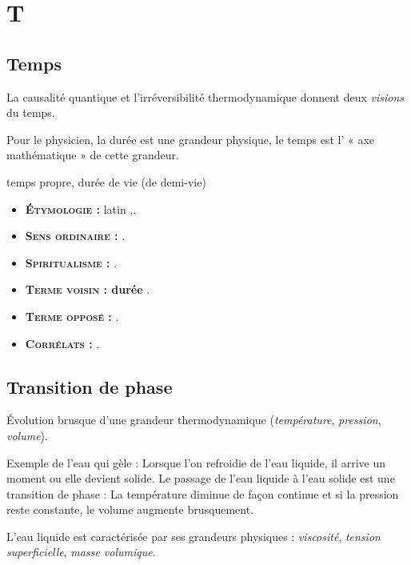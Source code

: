 \chapter{T}
\section{Temps}

La causalité quantique et l'irréversibilité thermodynamique
donnent deux {\it visions} du temps.

Pour le physicien, la durée est une grandeur physique, le
temps est l' « axe mathématique » de cette grandeur.

temps propre, durée de vie (de demi-vie)

{\footnotesize
\begin{itemize}[leftmargin=1cm, label=, itemsep=1pt]
\item {\bf \textsc{Étymologie} :} latin {\it },.
\item {\bf \textsc{Sens ordinaire} :} .
\item {\bf \textsc{Spiritualisme} :} .
\end{itemize}

\begin{itemize}[leftmargin=1cm, label=, itemsep=1pt]
\item {\bf \textsc{Terme voisin} : durée} .
\item {\bf \textsc{Terme opposé} :} .
\item {\bf \textsc{Corrélats} :} .
\end{itemize}
}

\section{Transition de phase}

Évolution brusque d'une grandeur thermodynamique ({\it température}, {\it pression}, {\it volume}).

Exemple de l'eau qui gèle : Lorsque l'on refroidie de l'eau liquide, il arrive un moment ou elle devient solide. Le passage de l'eau liquide à l'eau solide est une transition de phase : La température diminue de façon continue et si la pression reste constante, le volume augmente brusquement.

L'eau liquide est caractérisée par ses grandeurs physiques : {\it viscosité}, {\it tension superficielle}, {\it masse volumique}.


